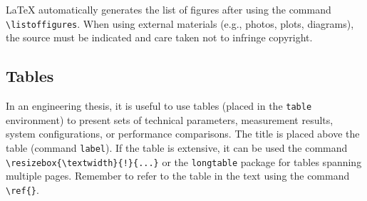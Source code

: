 
\noindent LaTeX automatically generates the list of figures after using the command \verb|\listoffigures|. When using external materials (e.g., photos, plots, diagrams), the source must be indicated and care taken not to infringe copyright.

\subsection{Tables}
In an engineering thesis, it is useful to use tables (placed in the \verb|table| environment) to present sets of technical parameters, measurement results, system configurations, or performance comparisons. The title is placed above the table (command \verb|label|). If the table is extensive, it can be used the command \verb|\resizebox{\textwidth}{!}{...}| or the \verb|longtable| package for tables spanning multiple pages. Remember to refer to the table in the text using the command \verb|\ref{}|.


